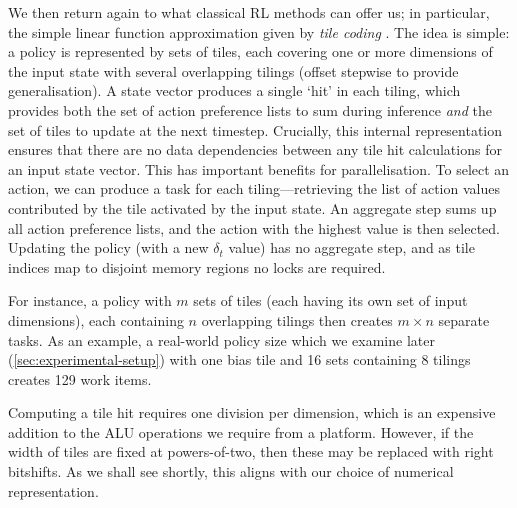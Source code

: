 We then return again to what classical RL methods can offer us; in particular, the simple linear function approximation given by \emph{tile coding} \cite[pp.\ \numrange{217}{221}]{RL2E}.
The idea is simple: a policy is represented by sets of tiles, each covering one or more dimensions of the input state with several overlapping tilings (offset stepwise to provide generalisation).
A state vector produces a single `hit' in each tiling, which provides both the set of action preference lists to sum during inference \emph{and} the set of tiles to update at the next timestep.
Crucially, this internal representation ensures that there are no data dependencies between any tile hit calculations for an input state vector.
This has important benefits for parallelisation.
To select an action, we can produce a task for each tiling---retrieving the list of action values contributed by the tile activated by the input state.
An aggregate step sums up all action preference lists, and the action with the highest value is then selected.
Updating the policy (with a new $\delta_t$ value) has no aggregate step, and as tile indices map to disjoint memory regions no locks are required.

For instance, a policy with $m$ sets of tiles (each having its own set of input dimensions), each containing $n$ overlapping tilings then creates $m \times n$ separate tasks.
As an example, a real-world policy size which we examine later (\cref{sec:experimental-setup}) with one bias tile and \num{16} sets containing \num{8} tilings creates \num{129} work items.

Computing a tile hit requires one division per dimension, which is an expensive addition to the ALU operations we require from a platform.
However, if the width of tiles are fixed at powers-of-two, then these may be replaced with right bitshifts.
As we shall see shortly, this aligns with our choice of numerical representation.
